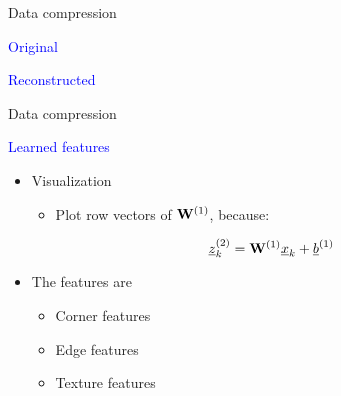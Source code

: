 	\begin{frame}[t]{Data compression}
	
	\begin{minipage}[t]{0.48\linewidth}
	\textcolor{blue}{\Large Original}	
		\begin{figure}
		\end{figure}
	\end{minipage}\hfill
	\begin{minipage}[t]{0.48\linewidth}
	\textcolor{blue}{\Large Reconstructed}
		\begin{figure}
		\end{figure}		
	\end{minipage}
	
	\end{frame}
	
	\begin{frame}[t]{Data compression}
	
	\begin{minipage}[t]{0.48\linewidth}
	\textcolor{blue}{\Large Learned features}	
			\begin{figure}
				\raggedleft
			\end{figure}

	\end{minipage}\hfill
	\begin{minipage}[t]{0.48\linewidth}
	\begin{itemize}
		\item Visualization
			\begin{itemize}
				\item Plot row vectors of ${\bf W}^{(1)}$, because:
			\end{itemize}
			\begin{equation}
				\underline{z}^{(2)}_k = {\bf W}^{(1)} \underline{x}_k + \underline{b}^{(1)} \nonumber
			\end{equation}

		\item The features are
		\begin{itemize}
			\item Corner features
			\item Edge features
			\item Texture features
		\end{itemize}
	\end{itemize}
	\end{minipage}
	
	\end{frame}
	
